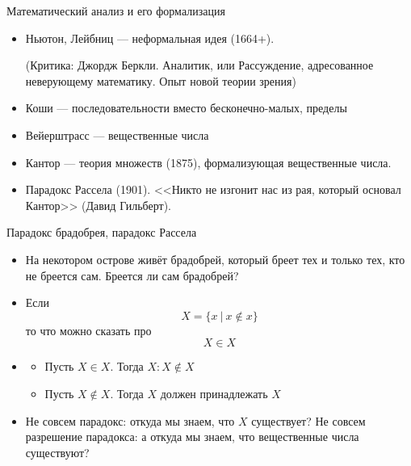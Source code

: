 \documentclass[aspectratio=169]{beamer}
\begin{document}
\begin{frame}{Математический анализ и его формализация}
\begin{itemize}
\item Ньютон, Лейбниц --- неформальная идея (1664+).

(Критика: Джордж Беркли. Аналитик, или Рассуждение, адресованное неверующему математику. Опыт новой теории зрения)
\item Коши --- последовательности вместо бесконечно-малых, пределы
\item Вейерштрасс --- вещественные числа
\item Кантор --- теория множеств (1875), формализующая вещественные числа.
\item Парадокс Рассела (1901). <<Никто не изгонит нас из рая, который основал Кантор>>
(Давид Гильберт).
\end{itemize}
\end{frame}

%

\begin{frame}{Парадокс брадобрея, парадокс Рассела}

\begin{itemize}
\item На некотором острове живёт брадобрей, который бреет тех и только тех, кто не бреется
сам. Бреется ли сам брадобрей? \pause
\item Если
$$X = \{ x \ |\ x \notin x\}$$ \pause
то что можно сказать про
$$X \in X$$ \pause

\item \begin{itemize}
\item Пусть $X \in X$. Тогда $X : X \notin X$\pause
\item Пусть $X \notin X$. Тогда $X$ должен принадлежать $X$\pause
\end{itemize}

\item Не совсем парадокс: откуда мы знаем, что $X$ существует? \pause
Не совсем разрешение парадокса: а откуда мы знаем, что вещественные числа существуют?
\end{itemize}
\end{frame}
\end{document}
